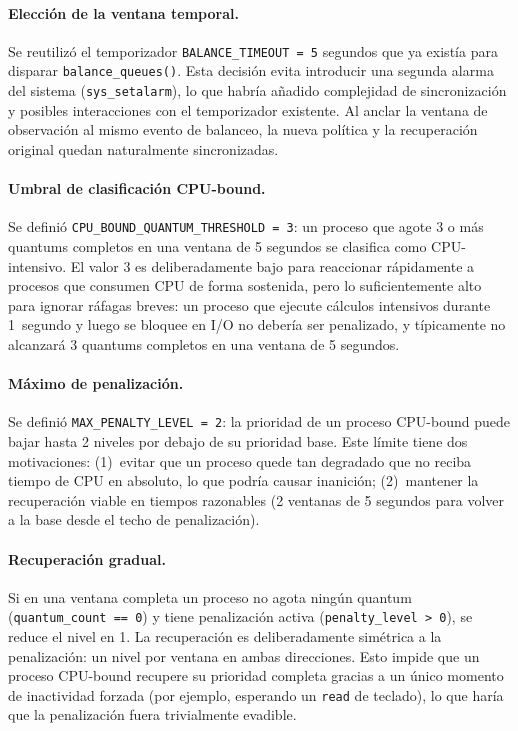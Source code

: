 \documentclass[11pt,a4paper]{article}
\begin{document}
\paragraph{Elecci\'on de la ventana temporal.}
Se reutiliz\'o el temporizador \texttt{BALANCE\_TIMEOUT = 5} segundos que ya exist\'ia para disparar \texttt{balance\_queues()}. Esta decisi\'on evita introducir una segunda alarma del sistema (\texttt{sys\_setalarm}), lo que habr\'ia a\~nadido complejidad de sincronizaci\'on y posibles interacciones con el temporizador existente. Al anclar la ventana de observaci\'on al mismo evento de balanceo, la nueva pol\'itica y la recuperaci\'on original quedan naturalmente sincronizadas.

\paragraph{Umbral de clasificaci\'on CPU-bound.}
Se defini\'o \texttt{CPU\_BOUND\_QUANTUM\_THRESHOLD = 3}: un proceso que agote 3 o m\'as quantums completos en una ventana de 5 segundos se clasifica como CPU-intensivo. El valor 3 es deliberadamente bajo para reaccionar r\'apidamente a procesos que consumen CPU de forma sostenida, pero lo suficientemente alto para ignorar r\'afagas breves: un proceso que ejecute c\'alculos intensivos durante 1~segundo y luego se bloquee en I/O no deber\'ia ser penalizado, y t\'ipicamente no alcanzar\'a 3 quantums completos en una ventana de 5 segundos.

\paragraph{M\'aximo de penalizaci\'on.}
Se defini\'o \texttt{MAX\_PENALTY\_LEVEL = 2}: la prioridad de un proceso CPU-bound puede bajar hasta 2 niveles por debajo de su prioridad base. Este l\'imite tiene dos motivaciones: (1)~evitar que un proceso quede tan degradado que no reciba tiempo de CPU en absoluto, lo que podr\'ia causar inanici\'on; (2)~mantener la recuperaci\'on viable en tiempos razonables (2 ventanas de 5 segundos para volver a la base desde el techo de penalizaci\'on).

\paragraph{Recuperaci\'on gradual.}
Si en una ventana completa un proceso no agota ning\'un quantum (\texttt{quantum\_count == 0}) y tiene penalizaci\'on activa (\texttt{penalty\_level > 0}), se reduce el nivel en 1. La recuperaci\'on es deliberadamente sim\'etrica a la penalizaci\'on: un nivel por ventana en ambas direcciones. Esto impide que un proceso CPU-bound recupere su prioridad completa gracias a un \'unico momento de inactividad forzada (por ejemplo, esperando un \texttt{read} de teclado), lo que har\'ia que la penalizaci\'on fuera trivialmente evadible.
\end{document}
